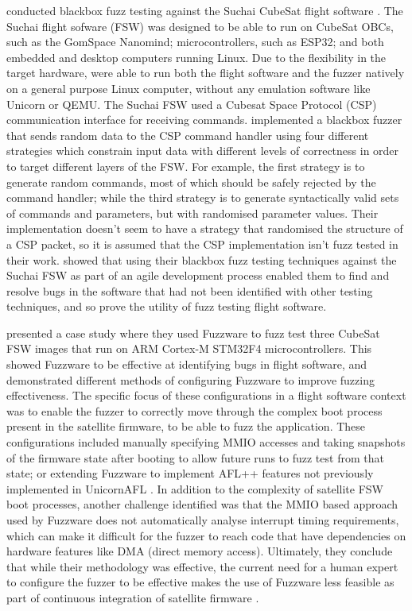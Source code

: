 \documentclass[../report.tex]{subfiles}
\begin{document}
\citet{Gutierrez_2021} conducted blackbox fuzz testing against the Suchai
CubeSat flight software \citep{Suchai_FSW}. The Suchai flight sofware (FSW) was
designed to be able to run on CubeSat OBCs, such as the GomSpace Nanomind;
microcontrollers, such as ESP32; and both embedded and desktop computers running
Linux. Due to the flexibility in the target hardware, \citet{Gutierrez_2021}
were able to run both the flight software and the fuzzer natively on a general
purpose Linux computer, without any emulation software like Unicorn or QEMU.
The Suchai FSW used a Cubesat Space Protocol (CSP) communication interface for
receiving commands. \citet{Gutierrez_2021} implemented a blackbox fuzzer that
sends random data to the CSP command handler using four different strategies
which constrain input data with different levels of correctness in order to target
different layers of the FSW. For example, the first strategy is to generate
random commands, most of which should be safely rejected by the command
handler; while the third strategy is to generate syntactically valid sets of
commands and parameters, but with randomised parameter values. Their
implementation doesn't seem to have a strategy that randomised the structure of
a CSP packet, so it is assumed that the CSP implementation isn't fuzz tested in
their work.
\citet{Gutierrez_2021} showed that using their blackbox fuzz testing
techniques against the Suchai FSW as part of an agile development process
enabled them to find and resolve bugs in the software that had not been
identified with other testing techniques, and so prove the utility of fuzz
testing flight software.

\citet{Scharnowski_2023} presented a case study where they used Fuzzware
\citep{Fuzzware_2022} to fuzz test three CubeSat FSW images that run on ARM
Cortex-M STM32F4 microcontrollers. This showed Fuzzware to be effective at
identifying bugs in flight software, and demonstrated different methods of
configuring Fuzzware to improve fuzzing effectiveness. The specific focus of
these configurations in a flight software context was to enable the fuzzer to
correctly move through the complex boot process present in the satellite
firmware, to be able to fuzz the application. These configurations included
manually specifying MMIO accesses and %
taking snapshots of the firmware state after booting to allow future runs to
fuzz test from that state; or extending Fuzzware to implement AFL++ features
not previously implemented in UnicornAFL \citep{Scharnowski_2023}. In addition
to the complexity of satellite FSW boot processes, another challenge identified
was that the MMIO based approach used by Fuzzware does not automatically analyse
interrupt timing requirements, which can make it difficult for the fuzzer to
reach code that have dependencies on hardware features like DMA (direct memory
access). Ultimately, they conclude that while their methodology was effective,
the current need for a human expert to configure the fuzzer to be effective
makes the use of Fuzzware less feasible as part of continuous integration of
satellite firmware \citep{Scharnowski_2023}.
\end{document}
